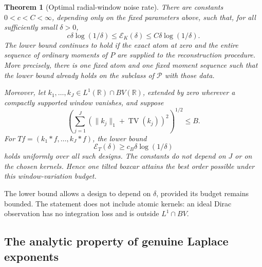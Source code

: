 \documentclass[11pt,letterpaper]{article}
\newtheorem{theorem}{Theorem}[section]
\theoremstyle{definition}
\theoremstyle{remark}
\newcommand{\1}{\mathbf 1}
\begin{document}
\begin{theorem}[Optimal radial-window noise rate]
\label{p07:thm:window-optimal}
There are constants $0<c<C<\infty$, depending only on the fixed
parameters above, such that, for all sufficiently small $\delta>0$,
\begin{equation}\label{p07:eq:window-rate}
 c\delta\log(1/\delta)\le\mathcal E_K(\delta)
                   \le C\delta\log(1/\delta).
\end{equation}
The lower bound continues to hold if the exact atom at zero and the
entire sequence of ordinary moments of $P$ are supplied to the
reconstruction procedure.  More precisely, there is one fixed atom and
one fixed moment sequence such that the lower bound already holds on
the subclass of $\mathcal P$ with those data.

Moreover, let $k_1,\ldots,k_J\in L^1(\mathbb R)\cap BV(\mathbb R)$,
extended by zero wherever a compactly supported window vanishes, and
suppose
\begin{equation}\label{p07:eq:window-budget}
 \left(\sum_{j=1}^J
       (\|k_j\|_1+\operatorname{TV}(k_j))^2\right)^{1/2}\le B.
\end{equation}
For $Tf=(k_1*f,\ldots,k_J*f)$, the lower bound
\begin{equation}\label{p07:eq:all-window-lower}
 \mathcal E_T(\delta)\ge c_B\delta\log(1/\delta)
\end{equation}
holds uniformly over all such designs.  The constants do not depend
on $J$ or on the chosen kernels.  Hence one tilted boxcar attains the
best order possible under this window-variation budget.
\end{theorem}

The lower bound allows a design to depend on $\delta$, provided its
budget remains bounded.  The statement does not include atomic kernels:
an ideal Dirac observation has no integration loss and is outside
$L^1\cap BV$.

\subsection{The analytic property of genuine Laplace exponents}
\end{document}
